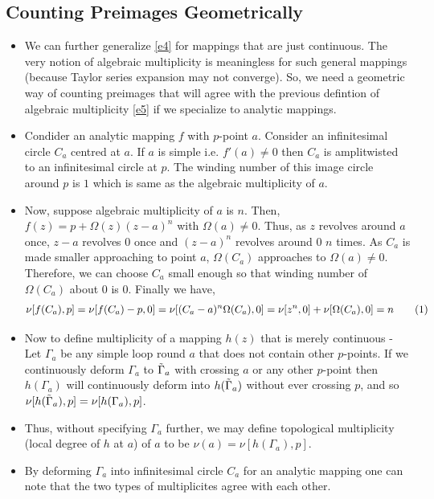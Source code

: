 \documentclass[12pt]{article}
\newcommand\numberthis{\addtocounter{equation}{1}\tag{\theequation}}
\def\td{\ensuremath\tilde}
\begin{document}
\subsection{Counting Preimages Geometrically}
\begin{itemize}
    \item We can further generalize \eqref{e4} for mappings that are just continuous. The very notion of algebraic multiplicity is meaningless for such general mappings (because Taylor series expansion may not converge). So, we need a geometric way of counting preimages that will agree with the previous defintion of algebraic multiplicity \eqref{e5} if we specialize to analytic mappings.
    \item Condider an analytic mapping $f$ with $p$-point $a$. Consider an infinitesimal circle $C_a$ centred at $a$. If $a$ is simple i.e. $f'(a)\neq 0$ then $C_a$ is amplitwisted to an infinitesimal circle at $p$. The winding number of this image circle around $p$ is $1$ which is same as the algebraic multiplicity of $a$.
    \item Now, suppose algebraic multiplicity of $a$ is $n$. Then, $f(z) = p + \Omega(z)(z-a)^{n}$ with $\Omega(a)\neq 0$. Thus, as $z$ revolves around $a$ once, $z-a$ revolves $0$ once and $(z-a)^n$ revolves around $0$ $n$ times. As $C_a$ is made smaller approaching to point $a$, $\Omega(C_a)$ approaches to $\Omega(a)\neq 0$. Therefore, we can choose $C_a$ small enough so that winding number of $\Omega(C_a)$ about $0$ is $0$. Finally we have,
    \begin{align*}
        \nu[f(C_a),p] = \nu[f(C_a)-p,0] = \nu[(C_a-a)^n\Omega(C_a),0] = \nu[z^n,0] + \nu[\Omega(C_a),0]=n \numberthis \label{e7}
    \end{align*}
    \item Now to define multiplicity of a mapping $h(z)$ that is merely continuous - Let $\Gamma_a$ be any simple loop round $a$ that does not contain other $p$-points. If we continuously deform $\Gamma_a$ to $\td{\Gamma}_a$ with crossing $a$ or any other $p$-point then $h(\Gamma_a)$ will continuously deform into $h(\td{\Gamma}_a)$ without ever crossing $p$, and so $\nu[h(\td{\Gamma}_a),p] = \nu[h(\Gamma_a),p]$.
    \item Thus, without specifying $\Gamma_a$ further, we may define topological multiplicity (local degree of $h$ at $a$) of $a$ to be $\nu(a) = \nu[h(\Gamma_a),p]$.
    \item By deforming $\Gamma_a$ into infinitesimal circle $C_a$ for an analytic mapping one can note that the two types of multiplicites agree with each other.
\end{itemize}
\end{document}

